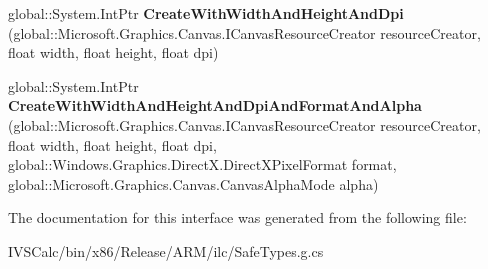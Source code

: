 \begin{DoxyCompactItemize}
\item 
\mbox{\label{interface_microsoft_1_1_graphics_1_1_canvas_1_1_i_canvas_render_target_factory_a4955cd48960b91634ca9ebaf71914d35}} 
global\+::\+System.\+Int\+Ptr {\bfseries Create\+With\+Width\+And\+Height\+And\+Dpi} (global\+::\+Microsoft.\+Graphics.\+Canvas.\+I\+Canvas\+Resource\+Creator resource\+Creator, float width, float height, float dpi)
\item 
\mbox{\label{interface_microsoft_1_1_graphics_1_1_canvas_1_1_i_canvas_render_target_factory_a25958fedb26248394e6b8cfbc8e3de9f}} 
global\+::\+System.\+Int\+Ptr {\bfseries Create\+With\+Width\+And\+Height\+And\+Dpi\+And\+Format\+And\+Alpha} (global\+::\+Microsoft.\+Graphics.\+Canvas.\+I\+Canvas\+Resource\+Creator resource\+Creator, float width, float height, float dpi, global\+::\+Windows.\+Graphics.\+Direct\+X.\+Direct\+X\+Pixel\+Format format, global\+::\+Microsoft.\+Graphics.\+Canvas.\+Canvas\+Alpha\+Mode alpha)
\end{DoxyCompactItemize}


The documentation for this interface was generated from the following file\+:\begin{DoxyCompactItemize}
\item 
I\+V\+S\+Calc/bin/x86/\+Release/\+A\+R\+M/ilc/Safe\+Types.\+g.\+cs\end{DoxyCompactItemize}
